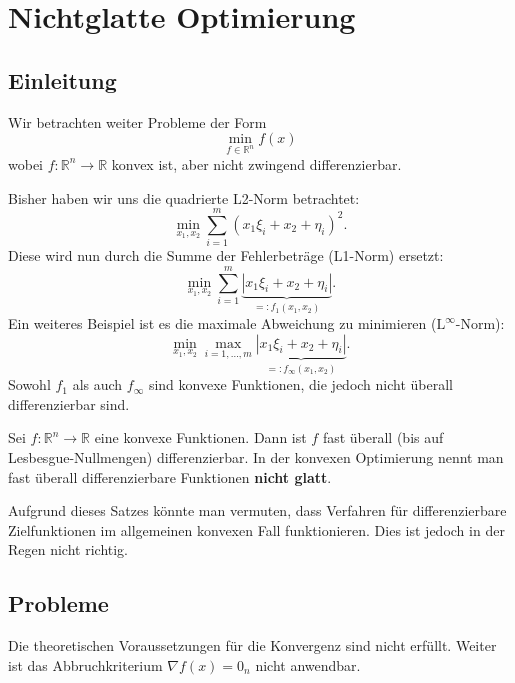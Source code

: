 \chapter{Nichtglatte Optimierung}
\section{Einleitung}
Wir betrachten weiter Probleme der Form
\begin{equation}
 \min_{f\in\mathbb{R}^n} f(x)
\end{equation}
wobei $f:\mathbb{R}^n\rightarrow \mathbb{R}$ konvex ist, aber nicht zwingend differenzierbar.

\begin{Beispiel}
Bisher haben wir uns die quadrierte L2-Norm betrachtet:
\begin{equation}
 \min_{x_1,x_2} \sum\limits_{i=1}^m(x_1\xi_i +x_2 +\eta_i)^2.
\end{equation}
Diese wird nun durch die Summe der Fehlerbeträge (L1-Norm) ersetzt:
\begin{equation}
 \min_{x_1,x_2} \sum\limits_{i=1}^m\underbrace{|x_1\xi_i +x_2 +\eta_i|}_{=:f_1(x_1,x_2)}.
\end{equation}
Ein weiteres Beispiel ist es die maximale Abweichung zu minimieren ($\text{L}^\infty$-Norm):
\begin{equation}
 \min_{x_1,x_2} \max_{i=1,\dots,m}\underbrace{|x_1\xi_i +x_2 +\eta_i|}_{=:f_\infty(x_1,x_2)}.
\end{equation}
Sowohl $f_1$ als auch $f_\infty$ sind konvexe Funktionen, die jedoch nicht überall differenzierbar sind.
\end{Beispiel}


\begin{Satz}
 Sei $f:\mathbb{R}^n\rightarrow\mathbb{R}$ eine konvexe Funktionen.
 Dann ist $f$ fast überall (bis auf Lesbesgue-Nullmengen) differenzierbar.
 In der konvexen Optimierung nennt man fast überall differenzierbare Funktionen \textbf{nicht glatt}. 
\end{Satz}

Aufgrund dieses Satzes könnte man vermuten, dass Verfahren für differenzierbare Zielfunktionen im allgemeinen 
konvexen Fall funktionieren. Dies ist jedoch in der Regen nicht richtig.

\section{Probleme}
Die theoretischen Voraussetzungen für die Konvergenz sind nicht erfüllt. Weiter ist das Abbruchkriterium $\nabla 
f(x)=0_n$ nicht anwendbar.

